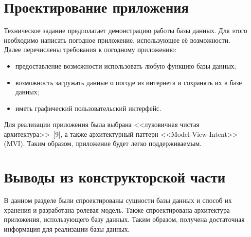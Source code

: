 \section{Проектирование приложения}
Техническое задание предполагает демонстрацию работы базы данных.
Для этого необходимо написать погодное приложение, использующее её возможности.
Далее перечислены требования к погодному приложению:
\begin{itemize}
    \item
        предоставление возможности использовать любую функцию базы данных;
    \item
        возможность загружать данные о погоде из интернета и сохранять их в базе данных;
    \item иметь графический пользовательский интерфейс.
\end{itemize}

Для реализации приложения была выбрана <<луковичная чистая архитектура>>~[9], а также архитектурный паттерн <<Model-View-Intent>> (MVI).
Таким образом, приложение будет легко поддерживаемым.

\section*{Выводы из конструкторской части}
В данном разделе были спроектированы сущности базы данных и способ их хранения и разработана ролевая модель.
Также спроектирована архитектура приложения, использующего базу данных.
Таким образом, получена достаточная информация для реализации базы данных.
